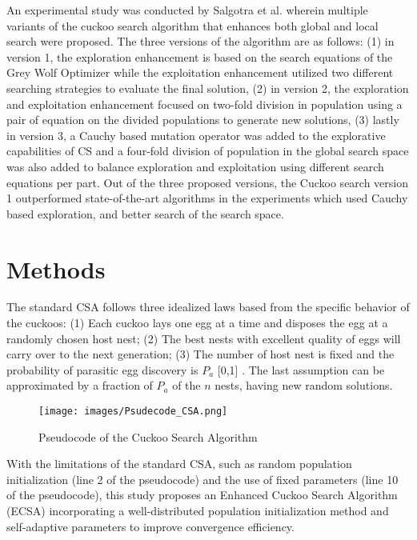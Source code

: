 \documentclass{article}
\begin{document}
An experimental study was conducted by Salgotra et al. \cite{salgotra2018new} wherein multiple variants of the cuckoo search algorithm that enhances both global and local search were proposed. The three versions of the algorithm are as follows: (1) in version 1, the exploration enhancement is based on the search equations of the Grey Wolf Optimizer while the exploitation enhancement utilized two different searching strategies to evaluate the final solution, (2) in version 2, the exploration and exploitation enhancement focused on two-fold division in population using a pair of equation on the divided populations to generate new solutions, (3) lastly in version 3, a Cauchy based mutation operator was added to the explorative capabilities of CS and a four-fold division of population in the global search space was also added to balance exploration and exploitation using different search equations per part. Out of the three proposed versions, the Cuckoo search version 1 outperformed state-of-the-art algorithms in the experiments which used Cauchy based exploration, and better search of the search space.

\section{Methods}
The standard CSA follows three idealized laws based from the specific behavior of the cuckoos: (1) Each cuckoo lays one egg at a time and disposes the egg at a randomly chosen host nest; (2) The best nests with excellent quality of eggs will carry over to the next generation; (3) The number of host nest is fixed and the probability of parasitic egg discovery is $P_a$ [0,1] \cite{roy2013cuckoo}. The last assumption can be approximated by a fraction of $P_a$ of the $n$ nests, having new random solutions.

\begin{figure}[htbp]
    \centering
    \texttt{[image: images/Psudecode\_CSA.png]}
    \caption{Pseudocode of the Cuckoo Search Algorithm}
    \label{fig:csa pseudocode}
\end{figure}


With the limitations of the standard CSA, such as random population initialization (line 2 of the pseudocode) and the use of fixed parameters (line 10 of the pseudocode), this study proposes an Enhanced Cuckoo Search Algorithm (ECSA) incorporating a well-distributed population initialization method and self-adaptive parameters to improve convergence efficiency.
\end{document}
